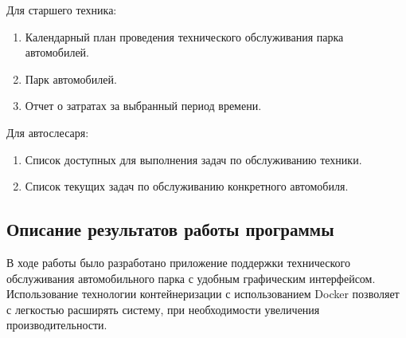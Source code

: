 \documentclass[../nirs.tex]{subfiles}
\begin{document}
    Для старшего техника:
    \begin{enumerate}
        \item Календарный план проведения технического обслуживания парка
            автомобилей.
        \item Парк автомобилей.
        \item Отчет о затратах за выбранный период времени.
    \end{enumerate}

    Для автослесаря:
    \begin{enumerate}
        \item Список доступных для выполнения задач по обслуживанию техники.
        \item Список текущих задач по обслуживанию конкретного автомобиля.
    \end{enumerate}

    \subsection{Описание результатов работы программы}

    В ходе работы было разработано приложение поддержки технического
    обслуживания автомобильного парка с удобным графическим
    интерфейсом. Использование технологии контейнеризации с использованием
    Docker позволяет с легкостью расширять систему, при необходимости увеличения
    производительности.
\end{document}

